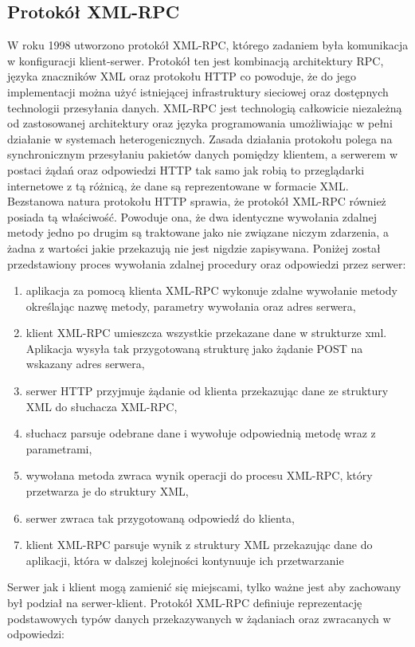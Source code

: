 \subsection{Protokół XML-RPC}
W roku 1998 utworzono protokół XML-RPC, którego zadaniem była komunikacja w konfiguracji klient-serwer. Protokół ten jest kombinacją architektury RPC, języka znaczników XML oraz protokołu HTTP co powoduje, że do jego implementacji można użyć istniejącej infrastruktury sieciowej oraz dostępnych technologii przesyłania danych\cite{laurent2001programming}. XML-RPC jest technologią całkowicie niezależną od zastosowanej architektury oraz języka programowania umożliwiając w pełni działanie w systemach heterogenicznych. Zasada działania protokołu polega na synchronicznym przesyłaniu pakietów danych pomiędzy klientem, a serwerem w postaci żądań oraz odpowiedzi HTTP tak samo jak robią to przeglądarki internetowe z tą różnicą, że dane są reprezentowane w formacie XML\@. Bezstanowa natura protokołu HTTP sprawia, że protokół XML-RPC również posiada tą właściwość. Powoduje ona, że dwa identyczne wywołania zdalnej metody jedno po drugim są traktowane jako nie związane niczym zdarzenia, a żadna z wartości jakie przekazują nie jest nigdzie zapisywana. Poniżej został przedstawiony proces wywołania zdalnej procedury oraz odpowiedzi przez serwer:
\begin{enumerate}
	\item aplikacja za pomocą klienta XML-RPC wykonuje zdalne wywołanie metody \\ określając nazwę metody, parametry wywołania oraz adres serwera,
	\item klient XML-RPC umieszcza wszystkie przekazane dane w strukturze xml.
	      Aplikacja wysyła tak przygotowaną strukturę jako żądanie POST na wskazany adres serwera,
	\item serwer HTTP przyjmuje żądanie od klienta przekazując dane ze struktury XML do słuchacza XML-RPC,
	\item słuchacz parsuje odebrane dane i wywołuje odpowiednią metodę wraz z parametrami,
	\item wywołana metoda zwraca wynik operacji do procesu XML-RPC, który przetwarza je do struktury XML,
	\item serwer zwraca tak przygotowaną odpowiedź do klienta,
	\item klient XML-RPC parsuje wynik z struktury XML przekazując dane do aplikacji, która w dalszej kolejności kontynuuje ich przetwarzanie
\end{enumerate}
Serwer jak i klient mogą zamienić się miejscami, tylko ważne jest aby zachowany był podział na serwer-klient. Protokół XML-RPC definiuje reprezentację podstawowych typów danych przekazywanych w żądaniach oraz zwracanych w odpowiedzi:
